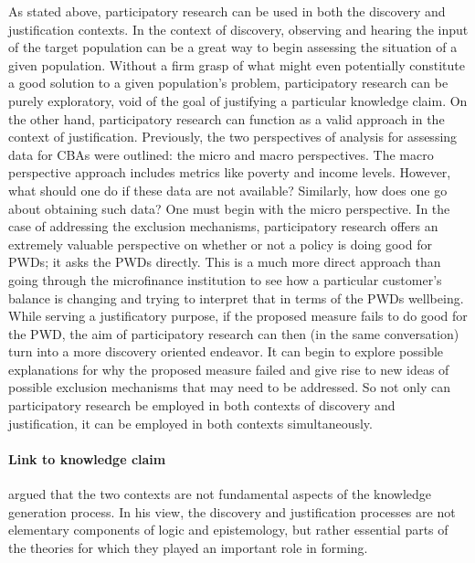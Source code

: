 \documentclass[a4paper]{article}
\begin{document}
As stated above, participatory research can be used in both the discovery and
justification contexts. In the context of discovery, observing and hearing the
input of the target population can be a great way to begin assessing the
situation of a given population. Without a firm grasp of what might even
potentially constitute a good solution to a given population's problem,
participatory research can be purely exploratory, void of the goal of
justifying a particular knowledge claim. On the other hand, participatory
research can function as a valid approach in the context of justification.
Previously, the two perspectives of analysis for assessing data for CBAs were
outlined: the micro and macro perspectives. The macro perspective approach
includes metrics like poverty and income levels. However, what should one do
if these data are not available? Similarly, how does one go about obtaining
such data? One must begin with the micro perspective. In the case of
addressing the exclusion mechanisms, participatory research offers an
extremely valuable perspective on whether or not a policy is doing good for
PWDs; it asks the PWDs directly. This is a much more direct approach than
going through the microfinance institution to see how a particular customer's
balance is changing and trying to interpret that in terms of the PWDs
wellbeing. While serving a justificatory purpose, if the proposed measure
fails to do good for the PWD, the aim of participatory research can then (in
the same conversation) turn into a more discovery oriented endeavor. It can
begin to explore possible explanations for why the proposed measure failed and
give rise to new ideas of possible exclusion mechanisms that may need to be
addressed. So not only can participatory research be employed in both contexts
of discovery and justification, it can be employed in both contexts
simultaneously.


\paragraph{Link to knowledge claim}

\cite{kuhn1970structure} argued that the two contexts are not fundamental
aspects of the knowledge generation process. In his view, the discovery and
justification processes are not elementary components of logic and
epistemology, but rather essential parts of the theories for which they played
an important role in forming.
\end{document}
